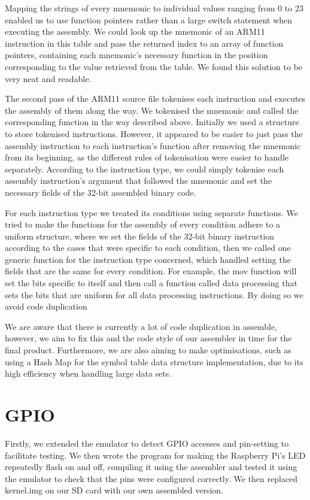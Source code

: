 \documentclass[11pt]{article}
\begin{document}
Mapping the strings of every mnemonic to individual values ranging from 0 to 23 enabled us to use function pointers rather than a large switch statement when executing the assembly. We could look up the mnemonic of an ARM11 instruction in this table and pass the returned index to an array of function pointers, containing each mnemonic’s necessary function in the position corresponding to the value retrieved from the table. We found this solution to be very neat and readable. 

The second pass of the ARM11 source file tokenises each instruction and executes the assembly of them along the way. We tokenised the mnemonic and called the corresponding function in the way described above. Initially we used a structure to store tokenised instructions. However, it appeared to be easier to just pass the assembly instruction to each instruction’s function after removing the mnemonic from its beginning, as the different rules of tokenisation were easier to handle separately. According to the instruction type, we could simply tokenise each assembly instruction’s argument that followed the mnemonic and set the necessary fields of the 32-bit assembled binary code.

For each instruction type we treated its conditions using separate functions. We tried to make the functions for the assembly of every condition adhere to a uniform structure, where we set the fields of the 32-bit binary instruction according to the cases that were specific to each condition, then we called one generic function for the instruction type concerned, which handled setting the fields that are the same for every condition. For example, the mov function will set the bits specific to itself and then call a function called data processing that sets the bits that are uniform for all data processing instructions. By doing so we avoid code duplication 

We are aware that there is currently a lot of code duplication in assemble, however, we aim to fix this and the code style of our assembler in time for the final product. Furthermore, we are also aiming to make optimisations, such as using a Hash Map for the symbol table data structure implementation, due to its high efficiency when handling large data sets.

\section{GPIO}

Firstly, we extended the emulator to detect GPIO accesses and pin-setting to facilitate testing. We then wrote the program for making the Raspberry Pi’s LED repeatedly flash on and off, compiling it using the assembler and tested it using the emulator to check that the pins were configured correctly. We then replaced kernel.img on our SD card with our own assembled version.
\end{document}
